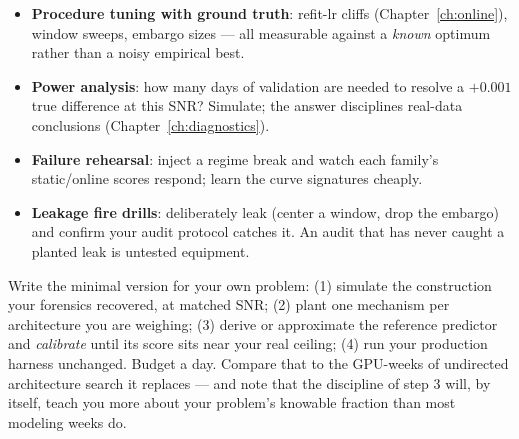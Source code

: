 \begin{itemize}
\item \textbf{Procedure tuning with ground truth}: refit-lr cliffs
  (Chapter~\ref{ch:online}), window sweeps, embargo sizes --- all
  measurable against a \emph{known} optimum rather than a noisy
  empirical best.
\item \textbf{Power analysis}: how many days of validation are needed to
  resolve a $+0.001$ true difference at this SNR? Simulate; the answer
  disciplines real-data conclusions
  (Chapter~\ref{ch:diagnostics}).
\item \textbf{Failure rehearsal}: inject a regime break and watch each
  family's static/online scores respond; learn the curve signatures
  cheaply.
\item \textbf{Leakage fire drills}: deliberately leak (center a window,
  drop the embargo) and confirm your audit protocol catches it. An
  audit that has never caught a planted leak is untested equipment.
\end{itemize}

\begin{drillbox}
Write the minimal version for your own problem: (1) simulate the
construction your forensics recovered, at matched SNR; (2) plant one
mechanism per architecture you are weighing; (3) derive or approximate
the reference predictor and \emph{calibrate} until its score sits near
your real ceiling; (4) run your production harness unchanged. Budget a
day. Compare that to the GPU-weeks of undirected architecture search it
replaces --- and note that the discipline of step 3 will, by itself,
teach you more about your problem's knowable fraction than most modeling
weeks do.
\end{drillbox}
